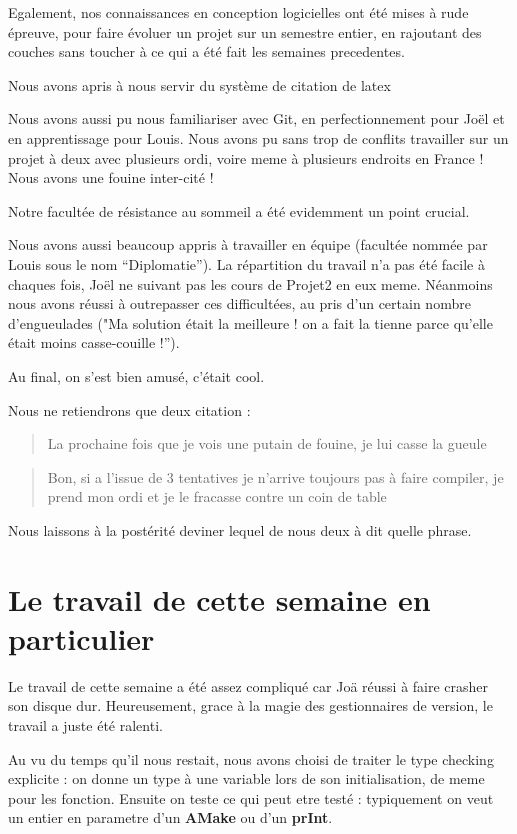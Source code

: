 \documentclass[a4paper,10pt]{report}
\begin{document}
Egalement, nos connaissances en conception logicielles ont été mises à rude épreuve, pour faire évoluer un projet sur un semestre entier, en rajoutant des couches sans toucher à ce qui a été fait les semaines precedentes.

Nous avons apris à nous servir du système de citation de latex \cite{Zizi}

Nous avons aussi pu nous familiariser avec Git, en perfectionnement pour Jo\"el et en apprentissage pour Louis. Nous avons pu sans trop de conflits travailler sur un projet à deux avec plusieurs ordi, voire meme à plusieurs endroits en France ! Nous avons une fouine inter-cité !

Notre facultée de résistance au sommeil a été evidemment un point crucial.

Nous avons aussi beaucoup appris à travailler en équipe (facultée nommée par Louis sous le nom ``Diplomatie''). La répartition du travail n'a pas été facile à chaques fois, Jo\"el ne suivant pas les cours de Projet2 en eux meme. Néanmoins nous avons réussi à outrepasser ces difficultées, au pris d'un certain nombre d'engueulades ("Ma solution était la meilleure ! on a fait la tienne parce qu'elle était moins casse-couille !'').

Au final, on s'est bien amusé, c'était cool.

Nous ne retiendrons que deux citation : 

\begin{quote}
La prochaine fois que je vois une putain de fouine, je lui casse la gueule
\end{quote}

\begin{quote}
Bon, si a l'issue de 3 tentatives je n'arrive toujours pas à faire compiler, je prend mon ordi et je le fracasse contre un coin de table
\end{quote}

Nous laissons à la postérité deviner lequel de nous deux à dit quelle phrase.


\section{Le travail de cette semaine en particulier}
Le travail de cette semaine a été assez compliqué car Jo\" a réussi à faire crasher son disque dur. Heureusement, grace à la magie des gestionnaires de version, le travail a juste été ralenti.

Au vu du temps qu'il nous restait, nous avons choisi de traiter le type checking explicite : on donne un type à une variable lors de son initialisation, de meme pour les fonction. Ensuite on teste ce qui peut etre testé : typiquement on veut un entier en parametre d'un \textbf{AMake} ou d'un \textbf{prInt}.
\end{document}
